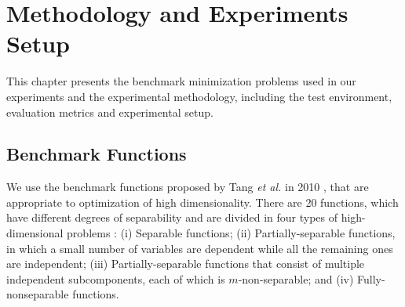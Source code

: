 \chapter{Methodology and Experiments Setup}\label{cap:methodology}
This chapter presents the benchmark minimization problems used in our experiments and the experimental methodology, including the test environment, evaluation metrics and experimental setup.

\section{Benchmark Functions}
We use the benchmark functions proposed by Tang \emph{et al.} in 2010 \cite{CEC:Tang2010}, that are appropriate to optimization of high dimensionality. There are 20 functions, which have different degrees of separability and are divided in four types of high-dimensional problems \cite{CEC:Tang2010}: (i) Separable functions; (ii) Partially-separable functions, in which a small number of variables are dependent while all the remaining ones are independent; (iii) Partially-separable functions that consist of multiple independent subcomponents, each of which is $m$-non-separable; and (iv) Fully-nonseparable functions.

